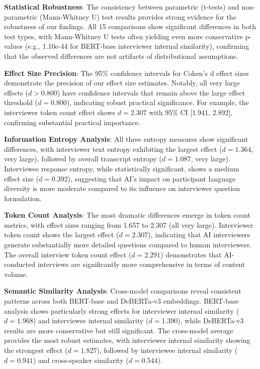 \documentclass[sigchi,nonacm,manuscript]{acmart}
\begin{document}
\textbf{Statistical Robustness}: The consistency between parametric (t-tests) and non-parametric (Mann-Whitney U) test results provides strong evidence for the robustness of our findings. All 15 comparisons show significant differences in both test types, with Mann-Whitney U tests often yielding even more conservative p-values (e.g., 1.10e-44 for BERT-base interviewer internal similarity), confirming that the observed differences are not artifacts of distributional assumptions.

\textbf{Effect Size Precision}: The 95\% confidence intervals for Cohen's d effect sizes demonstrate the precision of our effect size estimates. Notably, all very large effects ($d > 0.800$) have confidence intervals that remain above the large effect threshold ($d = 0.800$), indicating robust practical significance. For example, the interviewer token count effect shows $d = 2.307$ with 95\% CI [1.941, 2.892], confirming substantial practical importance.

\textbf{Information Entropy Analysis}: All three entropy measures show significant differences, with interviewer text entropy exhibiting the largest effect ($d = 1.364$, very large), followed by overall transcript entropy ($d = 1.087$, very large). Interviewee response entropy, while statistically significant, shows a medium effect size ($d = 0.392$), suggesting that AI's impact on participant language diversity is more moderate compared to its influence on interviewer question formulation.

\textbf{Token Count Analysis}: The most dramatic differences emerge in token count metrics, with effect sizes ranging from 1.657 to 2.307 (all very large). Interviewer token count shows the largest effect ($d = 2.307$), indicating that AI interviewers generate substantially more detailed questions compared to human interviewers. The overall interview token count effect ($d = 2.291$) demonstrates that AI-conducted interviews are significantly more comprehensive in terms of content volume.

\textbf{Semantic Similarity Analysis}: Cross-model comparisons reveal consistent patterns across both BERT-base and DeBERTa-v3 embeddings. BERT-base analysis shows particularly strong effects for interviewer internal similarity ($d = 1.968$) and interviewee internal similarity ($d = 1.390$), while DeBERTa-v3 results are more conservative but still significant. The cross-model average provides the most robust estimates, with interviewer internal similarity showing the strongest effect ($d = 1.827$), followed by interviewee internal similarity ($d = 0.941$) and cross-speaker similarity ($d = 0.544$).
\end{document}

